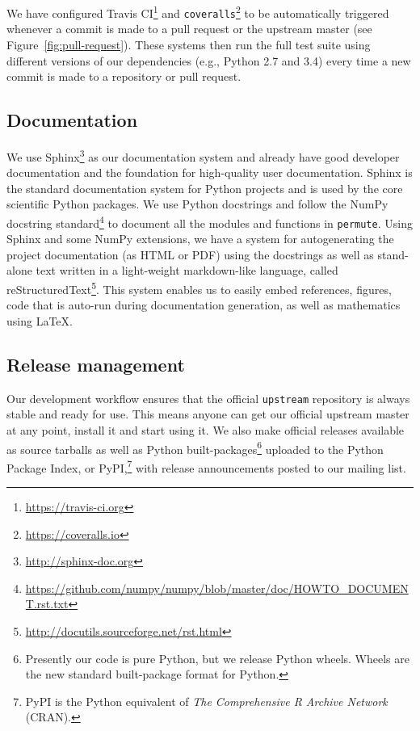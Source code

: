 \documentclass[]{article}
\begin{document}
We have configured Travis CI\footnote{\url{https://travis-ci.org}} and
\texttt{coveralls}\footnote{\url{https://coveralls.io}} to be automatically
triggered whenever a commit is made to a pull request or the upstream master
(see Figure~\ref{fig:pull-request}).
These systems then run the full test suite  using different versions of our
dependencies (e.g., Python 2.7 and 3.4) every time a new commit is made to a
repository or pull request.

\subsection{\label{sec:doc}Documentation}

We use Sphinx\footnote{\url{http://sphinx-doc.org}} as our documentation system
and already have good developer documentation and the foundation for
high-quality user documentation.
Sphinx is the standard documentation system for Python projects and is used by
the core scientific Python packages.
We use Python docstrings and follow the NumPy docstring
standard\footnote{\url{https://github.com/numpy/numpy/blob/master/doc/HOWTO\_DOCUMENT.rst.txt}}
to document all the modules and functions in \texttt{permute}.
Using Sphinx and some NumPy extensions, we have a system for autogenerating the
project documentation (as HTML or PDF) using the docstrings as well as
stand-alone text written in a light-weight markdown-like language, called
reStructuredText\footnote{\url{http://docutils.sourceforge.net/rst.html}}.
This system enables us to easily embed references, figures, code that is
auto-run during documentation generation, as well as mathematics using \LaTeX.

\subsection{\label{sec:release}Release management}

Our development workflow ensures that the official \texttt{upstream} repository
is always stable and ready for use.
This means anyone can get our official upstream master at any point, install it
and start using it.
We also make official releases available as source tarballs as well as Python
built-packages\footnote{Presently our code is pure Python, but we release
Python wheels.
Wheels are the new standard built-package format for Python.} uploaded to the
Python Package Index, or PyPI,\footnote{PyPI is the Python equivalent of \emph{The
Comprehensive R Archive Network} (CRAN).} with release announcements posted to
our mailing list.
\end{document}
